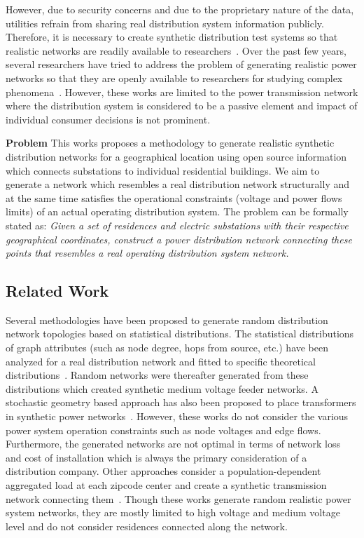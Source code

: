 \documentclass[sigconf]{acmart}
\begin{document}
However, due to security concerns and due to the proprietary nature of the data, utilities refrain from sharing real distribution system information publicly. Therefore, it is necessary to create synthetic distribution test systems so that realistic networks are readily available to researchers~\cite{kersting,8500,pnnl}.  Over the past few years, several researchers have tried to address the problem of generating realistic power networks so that they are openly available to researchers for studying complex phenomena~\cite{overbye_101,overbye_102,overbye_2019}. However, these works are limited to the power transmission network where the distribution system is considered to be a passive element and impact of individual consumer decisions is not prominent. 

\noindent\textbf{Problem} This works proposes a methodology to generate realistic synthetic distribution networks for a geographical location using open source information which connects substations to individual residential buildings. We aim to generate a network which resembles a real distribution network structurally and at the same time satisfies the operational constraints (voltage and power flows limits) of an actual operating distribution system. The problem can be formally stated as: \emph{Given a set of residences and electric substations with their respective geographical coordinates, %
	construct a power distribution network connecting these points that resembles a real operating distribution system network.}

\subsection{Related Work}\label{ssec:related}
Several methodologies have been proposed to generate random distribution network topologies based on statistical distributions. The statistical distributions of graph attributes (such as node degree, hops from source, etc.) have been analyzed for a real distribution network and fitted to specific theoretical distributions~\cite{schweitzer}. Random networks were thereafter generated from these distributions which created synthetic medium voltage feeder networks. A stochastic geometry based approach has also been proposed to place transformers in synthetic power networks~\cite{overbye_2019}. However, these works do not consider the various power system operation constraints such as node voltages and edge flows. Furthermore, the generated networks are not optimal in terms of network loss and cost of installation which is always the primary consideration of a distribution company. Other approaches consider a population-dependent aggregated load at each zipcode center and create a synthetic transmission network connecting them~\cite{overbye_101,overbye_102,overbye_2019}. Though these works generate random realistic power system networks, they are mostly limited to high voltage and medium voltage level and do not consider residences connected along the network.
\end{document}
